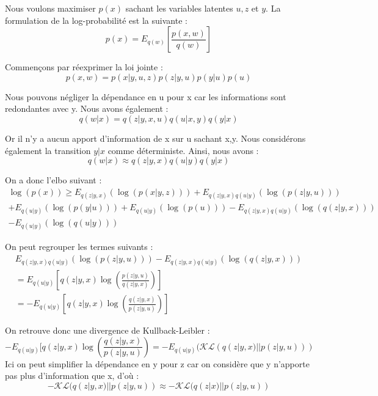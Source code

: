 \documentclass{article}
\begin{document}
Nous voulons maximiser $p(x)$ sachant les variables latentes $u,z$ et $y$.
La formulation de la log-probabilité est la suivante :
\begin{equation}
    p(x) = E_{q(w)}[\frac{p(x,w)}{q(w)}]
\end{equation}

Commençons par réexprimer la loi jointe :
\begin{equation}
    p(x,w) = p(x|y,u,z)p(z|y,u)p(y|u)p(u)
\end{equation}

Nous pouvons négliger la dépendance en u pour x car les informations sont redondantes avec y.
Nous avons également : 
\begin{equation}
     q(w|x) = q(z|y,x,u)q(u|x,y)q(y|x)
\end{equation}

Or il n'y a aucun apport d'information de x sur u sachant x,y. Nous considérons également la transition $y|x$ comme déterministe.
Ainsi, nous avons : 
\begin{equation}
    q(w|x) \approx q(z|y,x)q(u|y)q(y|x)
\end{equation}

On a  donc l'elbo suivant :
\begin{multline}
    \log(p(x)) \geq E_{q(z|y,x)}(\log(p(x|y,z))) + E_{q(z|y,x)q(u|y)}(\log(p(z|y,u))) \\+ E_{q(u|y)}(\log(p(y|u))) + E_{q(u|y)}(\log(p(u))) - E_{q(z|y,x)q(u|y)}(\log(q(z|y,x)))\\ - E_{q(u|y)}(\log(q(u|y)))
\end{multline}

On peut regrouper les termes suivants :
\begin{multline}    
    E_{q(z|y,x)q(u|y)}(\log(p(z|y,u))) - E_{q(z|y,x)q(u|y)}(\log(q(z|y,x)))\\ = E_{q(u|y)}[q(z|y,x)\log(\frac{p(z|y,u)}{q(z|y,x)})]\\ = - E_{q(u|y)}[q(z|y,x)\log(\frac{q(z|y,x)}{p(z|y,u)}) ] 
\end{multline}

On retrouve donc une divergence de Kullback-Leibler :
\begin{equation}
     - E_{q(u|y)}[q(z|y,x)\log(\frac{q(z|y,x)}{p(z|y,u)}) = - E_{q(u|y)}(\mathcal{KL}(q(z|y,x)||p(z|y,u)))
\end{equation}
Ici on peut simplifier la dépendance en y pour z car on considère que y n'apporte pas plus d'information que x, d'où :
\begin{equation}
     - \mathcal{KL}(q(z|y,x)||p(z|y,u)) \approx - \mathcal{KL}(q(z|x)||p(z|y,u))
\end{equation}
\end{document}
